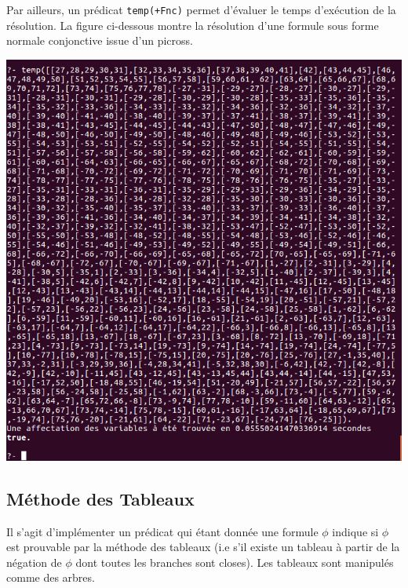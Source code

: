 \documentclass[12pt,a4paper]{article}
\begin{document}
Par ailleurs, un prédicat \texttt{temp(+Fnc)} permet d'évaluer le temps d'exécution de la résolution. La figure ci-dessous montre la résolution d'une formule sous forme normale conjonctive issue d'un picross.

\begin{center}
\includegraphics[width = 400pt]{TempDpll.png}
\end{center}

\subsection{Méthode des Tableaux}
Il s'agit d'implémenter un prédicat qui étant donnée une formule $\phi$ indique si $\phi$ est prouvable par la méthode des tableaux (i.e s'il existe un tableau à partir de la négation de $\phi$ dont toutes les branches sont closes). Les tableaux sont manipulés comme des arbres.
\end{document}
